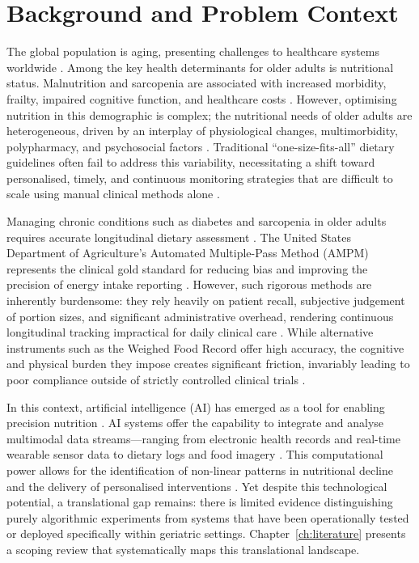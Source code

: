 \section{Background and Problem Context}

The global population is aging, presenting challenges to healthcare systems worldwide \citep{worldhealthorganizationWHOClinicalConsortium2025}. Among the key health determinants for older adults is nutritional status. Malnutrition and sarcopenia are associated with increased morbidity, frailty, impaired cognitive function, and healthcare costs \citep{dentMalnutritionOlderAdults2023}. However, optimising nutrition in this demographic is complex; the nutritional needs of older adults are heterogeneous, driven by an interplay of physiological changes, multimorbidity, polypharmacy, and psychosocial factors \citep{kaurNutritionalInterventionsElderly2019}. Traditional ``one-size-fits-all'' dietary guidelines often fail to address this variability, necessitating a shift toward personalised, timely, and continuous monitoring strategies that are difficult to scale using manual clinical methods alone \citep{ordovasPersonalizedNutritionHealthy2020}.

Managing chronic conditions such as diabetes and sarcopenia in older adults requires accurate longitudinal dietary assessment \citep{shimDietaryAssessmentMethods2014,evertNutritionTherapyAdults2019}. The United States Department of Agriculture's Automated Multiple-Pass Method (AMPM) represents the clinical gold standard for reducing bias and improving the precision of energy intake reporting \citep{moshfeghUSDepartmentAgriculture2008}. However, such rigorous methods are inherently burdensome: they rely heavily on patient recall, subjective judgement of portion sizes, and significant administrative overhead, rendering continuous longitudinal tracking impractical for daily clinical care \citep{shimDietaryAssessmentMethods2014,willettNutritionalEpidemiology2012}. While alternative instruments such as the Weighed Food Record offer high accuracy, the cognitive and physical burden they impose creates significant friction, invariably leading to poor compliance outside of strictly controlled clinical trials \citep{burkeSelfMonitoringWeightLoss2011,cordeiroBarriersNegativeNudges2015,thompsonDietaryAssessmentMethodology2017}.

In this context, artificial intelligence (AI) has emerged as a tool for enabling precision nutrition \citep{alowaisRevolutionizingHealthcareRole2023}. AI systems offer the capability to integrate and analyse multimodal data streams---ranging from electronic health records and real-time wearable sensor data to dietary logs and food imagery \citep{tsolakidisArtificialIntelligenceMachine2024}. This computational power allows for the identification of non-linear patterns in nutritional decline and the delivery of personalised interventions \citep{kirkMachineLearningNutrition2022}. Yet despite this technological potential, a translational gap remains: there is limited evidence distinguishing purely algorithmic experiments from systems that have been operationally tested or deployed specifically within geriatric settings. Chapter~\ref{ch:literature} presents a scoping review that systematically maps this translational landscape.

